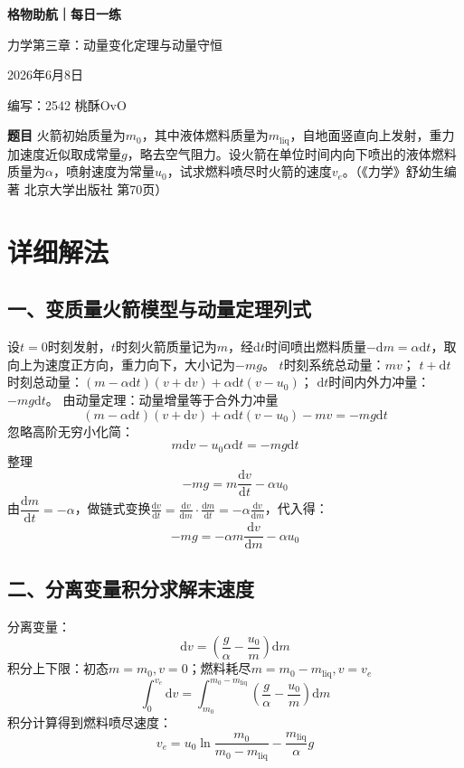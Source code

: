 \documentclass[11pt,a4paper]{ctexart}
\newcommand{\dd}{\mathrm{d}}
\begin{document}
\begin{center}
  {\Large\bfseries\color{mainblue} 格物助航｜每日一练}\par
  \vspace{0.25em}
  {\large 力学第三章：动量变化定理与动量守恒}\par
  \vspace{0.35em}
  {\small 2026年6月8日}\par
  \vspace{0.35em}
  {\small 编写：2542 桃酥OvO}
\end{center}
\vspace{-0.3em}
\begin{problemBox}
\noindent\textbf{题目}\quad
火箭初始质量为$m_0$，其中液体燃料质量为$m_\mathrm{liq}$，自地面竖直向上发射，重力加速度近似取成常量$g$，略去空气阻力。设火箭在单位时间内向下喷出的液体燃料质量为$\alpha$，喷射速度为常量$u_0$，试求燃料喷尽时火箭的速度$v_e$。（《力学》舒幼生编著 北京大学出版社 第70页）
\end{problemBox}
\section*{详细解法}
\subsection*{一、变质量火箭模型与动量定理列式}
设$t=0$时刻发射，$t$时刻火箭质量记为$m$，经$\dd t$时间喷出燃料质量$-\dd m=\alpha \dd t$，取向上为速度正方向，重力向下，大小记为$-mg$。
$t$时刻系统总动量：$mv$；
$t+\dd t$时刻总动量：$(m-\alpha \dd t)(v+\dd v)+\alpha \dd t(v-u_0)$；
$\dd t$时间内外力冲量：$-mg\dd t$。
由动量定理：动量增量等于合外力冲量
\[
(m-\alpha \dd t)(v+\dd v)+\alpha \dd t(v-u_0)-mv=-mg\dd t
\]
忽略高阶无穷小化简：
\[
m\dd v -u_0 \alpha \dd t = -mg\dd t
\]
整理
\[
-mg = m\frac{\dd v}{\dd t}-\alpha u_0
\]
由$\dfrac{\dd m}{\dd t}=-\alpha$，做链式变换$\displaystyle \frac{\dd v}{\dd t}=\frac{\dd v}{\dd m}\cdot \frac{\dd m}{\dd t}=-\alpha \frac{\dd v}{\dd m}$，代入得：
\[
-mg = -\alpha m \frac{\dd v}{\dd m}-\alpha u_0
\]

\subsection*{二、分离变量积分求解末速度}
分离变量：
\[
\dd v=\left(\frac{g}{\alpha}-\frac{u_0}{m}\right)\dd m
\]
积分上下限：初态$m=m_0,v=0$；燃料耗尽$m=m_0-m_\mathrm{liq},v=v_e$
\[
\int_{0}^{v_e}\dd v=\int_{m_0}^{m_0-m_\mathrm{liq}} \left(\frac{g}{\alpha}-\frac{u_0}{m}\right)\dd m
\]
积分计算得到燃料喷尽速度：
\[
\boxed{v_e=u_0\ln\frac{m_0}{m_0-m_\mathrm{liq}}-\frac{m_\mathrm{liq}}{\alpha}g}
\]
\end{document}
